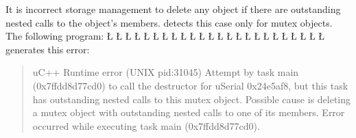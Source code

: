 \documentclass[openright,twoside]{report}
\begin{document}
It is incorrect storage management to delete any object if there are outstanding nested calls to the object's members.
\uC detects this case only for mutex objects.
The following program:
\LGinlinefalse\LGbegin\lgrinde
\L{}
\L{\LB{}}
\L{}
\L{}
\L{\LB{}}
\L{\LB{\};}}
\L{}
\L{\LB{}}
\L{}
\L{\LB{}}
\L{\LB{}}
\CE{}\L{\LB{}}
\CE{}\L{\LB{}}
\L{\LB{}}
\L{\LB{}}
\CE{}\L{\LB{}}
\L{\LB{\};}}
\endlgrinde\LGend
\LGinlinefalse\LGbegin\lgrinde
\L{}
\L{\LB{}}
\CE{}\L{\LB{\}}}
\L{}
\L{\LB{}}
\L{\LB{}}
\L{\LB{\}}}
\endlgrinde\LGend
generates this error:
\begin{quote}
\BGfont
uC++ Runtime error (UNIX pid:31045) Attempt by task main (0x7ffdd8d77cd0) to call the destructor for uSerial 0x24e5af8, but this task has outstanding nested calls to this mutex object.
Possible cause is deleting a mutex object with outstanding nested calls to one of its members.
Error occurred while executing task main (0x7ffdd8d77cd0).
\end{quote}
\end{document}
